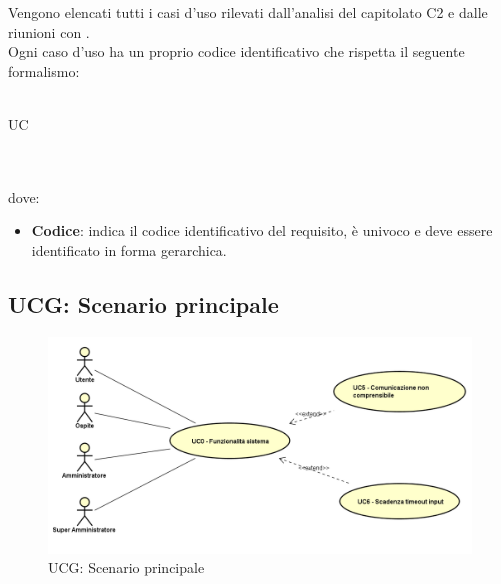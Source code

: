 \documentclass[AdR.tex]{subfiles}
\begin{document}
Vengono elencati tutti i casi d'uso rilevati dall'analisi del capitolato C2 e dalle riunioni con \PROPONENTE. \\
Ogni caso d'uso ha un proprio codice identificativo  che rispetta il seguente formalismo:\\ \\
\centerline{UC\textbraceright{}}
\\ \\dove:
\begin{itemize}
	\item \textbf{Codice}: indica il codice identificativo del requisito, è univoco e deve essere identificato in forma gerarchica.
\end{itemize}


\newpage
\subsection{UCG: Scenario principale}
\label{UCG}
\begin{figure}[h]
\centering
\includegraphics[width=\textwidth,height=\textheight,keepaspectratio]{images/UseCaseUCG.png}
\caption{UCG: Scenario principale}
\end{figure}
\end{document}

